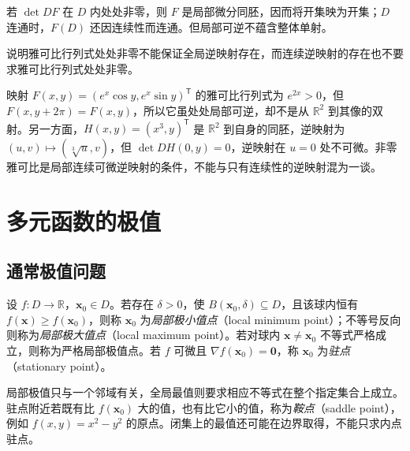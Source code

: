 \documentclass[UTF8,12pt,a4paper,fontset=fandol]{ctexbook}
\begin{document}
若 $\det DF$ 在 $D$ 内处处非零，则 $F$ 是局部微分同胚，因而将开集映为开集；$D$ 连通时，$F(D)$ 还因连续性而连通。但局部可逆不蕴含整体单射。

\begin{example}
\label{ex:local-versus-global-invertibility-ch14}
说明雅可比行列式处处非零不能保证全局逆映射存在，而连续逆映射的存在也不要求雅可比行列式处处非零。
\end{example}
\begin{solve}
映射 $F(x,y)=(e^x\cos y,e^x\sin y)^{\mathsf T}$ 的雅可比行列式为 $e^{2x}>0$，但 $F(x,y+2\pi)=F(x,y)$，所以它虽处处局部可逆，却不是从 $\mathbb R^2$ 到其像的双射。另一方面，$H(x,y)=(x^3,y)^{\mathsf T}$ 是 $\mathbb R^2$ 到自身的同胚，逆映射为 $(u,v)\mapsto(\sqrt[3]u,v)$，但 $\det DH(0,y)=0$，逆映射在 $u=0$ 处不可微。非零雅可比是局部连续可微逆映射的条件，不能与只有连续性的逆映射混为一谈。
\end{solve}

\section{多元函数的极值}
\label{sec:extrema-of-multivariable-functions}


\subsection{通常极值问题}
\label{subsec:unconstrained-extrema}

\begin{definition}
\label{def:multivariable-local-extrema-ch14}
设 $f:D\to\mathbb R$，$\boldsymbol x_0\in D$。若存在 $\delta>0$，使 $B(\boldsymbol x_0,\delta)\subseteq D$，且该球内恒有 $f(\boldsymbol x)\geq f(\boldsymbol x_0)$，则称 $\boldsymbol x_0$ 为\emph{局部极小值点}（local minimum point）；不等号反向则称为\emph{局部极大值点}（local maximum point）。若对球内 $\boldsymbol x\ne\boldsymbol x_0$ 不等式严格成立，则称为严格局部极值点。若 $f$ 可微且 $\nabla f(\boldsymbol x_0)=\boldsymbol0$，称 $\boldsymbol x_0$ 为\emph{驻点}（stationary point）。
\end{definition}

局部极值只与一个邻域有关，全局最值则要求相应不等式在整个指定集合上成立。驻点附近若既有比 $f(\boldsymbol x_0)$ 大的值，也有比它小的值，称为\emph{鞍点}（saddle point），例如 $f(x,y)=x^2-y^2$ 的原点。闭集上的最值还可能在边界取得，不能只求内点驻点。
\end{document}
